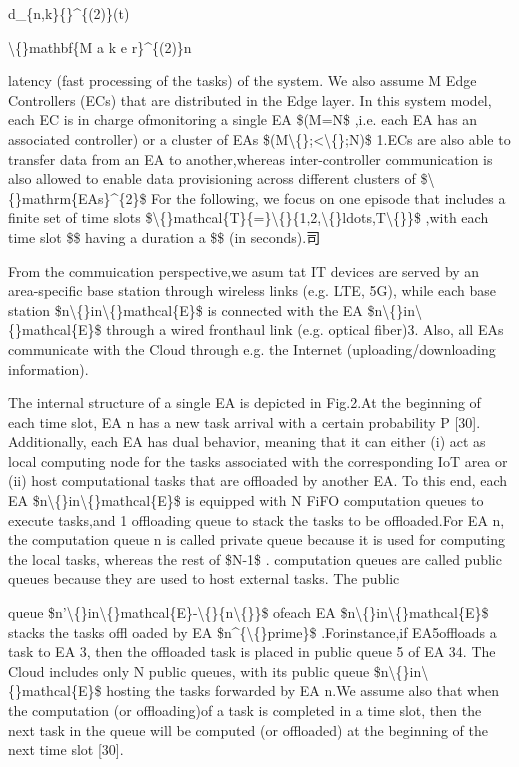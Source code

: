 \documentclass{article}
\begin{document}
d\_\{n,k\}\{\}\textasciicircum{}\{(2)\}(t)

\textbackslash\{\}mathbf\{M a k e r\}\textasciicircum{}\{(2)\}n

latency (fast processing of the tasks) of the system. We also assume M Edge Controllers (ECs) that are distributed in the Edge layer. In this system model, each EC is in charge ofmonitoring a single EA \$(M=N\$ ,i.e. each EA has an associated controller) or a cluster of EAs \$(M\textbackslash\{\};<\textbackslash\{\};N)\$ 1.ECs are also able to transfer data from an EA to another,whereas inter-controller communication is also allowed to enable data provisioning across different clusters of \$\textbackslash\{\}mathrm\{EAs\}\textasciicircum{}\{2\}\$ For the following, we focus on one episode that includes a finite set of time slots \$\textbackslash\{\}mathcal\{T\}\{=\}\textbackslash\{\}\{1,2,\textbackslash\{\}ldots,T\textbackslash\{\}\}\$ ,with each time slot \$\$ having a duration a \$\$ (in seconds).司

From the commuication perspective,we asum tat IT devices are served by an area-specific base station through wireless links (e.g. LTE, 5G), while each base station \$n\textbackslash\{\}in\textbackslash\{\}mathcal\{E\}\$ is connected with the EA \$n\textbackslash\{\}in\textbackslash\{\}mathcal\{E\}\$ through a wired fronthaul link (e.g. optical fiber)3. Also, all EAs communicate with the Cloud through e.g. the Internet (uploading/downloading information).

The internal structure of a single EA is depicted in Fig.2.At the beginning of each time slot, EA n has a new task arrival with a certain probability P [30]. Additionally, each EA has dual behavior, meaning that it can either (i) act as local computing node for the tasks associated with the corresponding IoT area or (ii) host computational tasks that are offloaded by another EA. To this end, each EA \$n\textbackslash\{\}in\textbackslash\{\}mathcal\{E\}\$ is equipped with N FiFO computation queues to execute tasks,and 1 offloading queue to stack the tasks to be offloaded.For EA n, the computation queue n is called private queue because it is used for computing the local tasks, whereas the rest of \$N-1\$ . computation queues are called public queues because they are used to host external tasks. The public

queue \$n'\textbackslash\{\}in\textbackslash\{\}mathcal\{E\}-\textbackslash\{\}\{n\textbackslash\{\}\}\$ ofeach EA \$n\textbackslash\{\}in\textbackslash\{\}mathcal\{E\}\$ stacks the tasks offl oaded by EA \$n\textasciicircum{}\{\textbackslash\{\}prime\}\$ .Forinstance,if EA5offloads a task to EA 3, then the offloaded task is placed in public queue 5 of EA 34. The Cloud includes only N public queues, with its public queue \$n\textbackslash\{\}in\textbackslash\{\}mathcal\{E\}\$ hosting the tasks forwarded by EA n.We assume also that when the computation (or offloading)of a task is completed in a time slot, then the next task in the queue will be computed (or offloaded) at the beginning of the next time slot [30].
\end{document}
